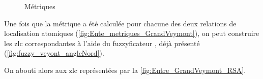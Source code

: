 \begin{figure}
  \caption{Métriques}
  \label{fig:Ente_metriques_GrandVeymont}
\end{figure}

Une fois que la métrique a été calculée pour chacune des deux
relations de localisation atomiques
(\autoref{fig:Ente_metriques_GrandVeymont}), on peut construire les
\ac{zlc} correspondantes à l'aide du fuzzyficateur
, déjà présenté
(\autoref{fig:fuzzy_veyont_angleNord}).

On abouti alors aux \ac{zlc} représentées par la
\autoref{fig:Entre_GrandVeymont_RSA}.


